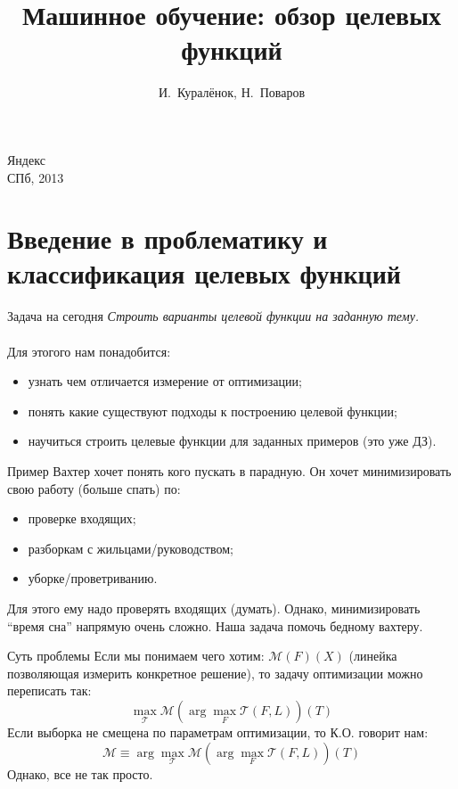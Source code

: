 \documentclass[14pt, fleqn, xcolor={dvipsnames, table}]{beamer}
\title{Машинное обучение: обзор целевых функций\\\small{}}
\author[]{\small{%
И.~Куралёнок,
Н.~Поваров}}
\date{}
\begin{document}
\begin{frame}
\maketitle
\small
\begin{center}
\vspace{-60pt}
\normalsize {\color{red}Я}ндекс \\
\vspace{80pt}
\footnotesize СПб, 2013
\end{center}
\end{frame}

\section{Введение в проблематику и классификация целевых функций}
\begin{frame}{Задача на сегодня}
\textit{Строить варианты целевой функции на заданную тему.}\\
~\\
Для этогого нам понадобится:
\begin{itemize}
  \item узнать чем отличается измерение от оптимизации;
  \item понять какие существуют подходы к построению целевой функции;
  \item научиться строить целевые функции для заданных примеров (это уже ДЗ).
\end{itemize}
\end{frame}

\begin{frame}{Пример}
Вахтер хочет понять кого пускать в парадную. Он хочет минимизировать свою работу (больше спать) по:
\begin{itemize}
   \item проверке входящих;
   \item разборкам с жильцами/руководством;
   \item уборке/проветриванию.
\end{itemize}
Для этого ему надо проверять входящих (думать).
Однако, минимизировать ``время сна'' напрямую очень сложно. Наша задача помочь бедному вахтеру.
\end{frame}

\begin{frame}{Суть проблемы}
Если мы понимаем чего хотим: $\mathcal{M}(F)(X)$ (линейка позволяющая измерить конкретное решение), то задачу оптимизации можно переписать так:
$$
\max_{\mathcal{T}} \mathcal{M} \left(\arg\max_{F} \mathcal{T}(F, L)\right)(T)
$$
Если выборка не смещена по параметрам оптимизации, то К.О. говорит нам:
$$
\mathcal{M} \equiv \arg \max_{\mathcal{T}} \mathcal{M}\left(\arg\max_{F} \mathcal{T}(F, L)\right)(T)
$$
Однако, все не так просто.
\end{frame}
\end{document}
